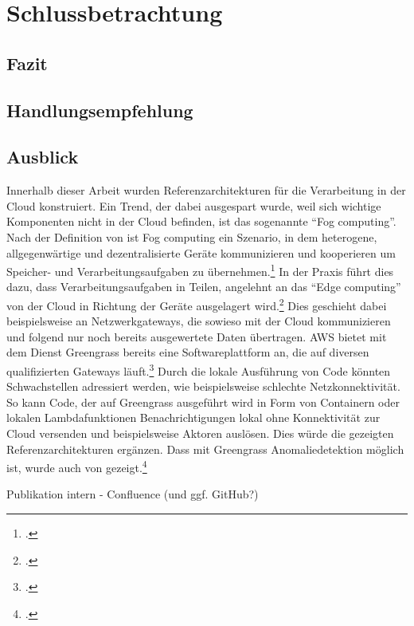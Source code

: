 \chapter{Schlussbetrachtung}

\section{Fazit}

\section{Handlungsempfehlung}

\section{Ausblick}
Innerhalb dieser Arbeit wurden Referenzarchitekturen für die Verarbeitung in der Cloud konstruiert. Ein Trend, der dabei ausgespart wurde, weil sich wichtige Komponenten nicht in der Cloud befinden, ist das sogenannte \enquote{Fog computing}. Nach der Definition von \citeauthor{Vaquero.2014} ist Fog computing ein Szenario, in dem heterogene, allgegenwärtige und dezentralisierte Geräte kommunizieren und kooperieren um Speicher- und Verarbeitungsaufgaben zu übernehmen.\footcite[Vgl.][30\psq]{Vaquero.2014} In der Praxis führt dies dazu, dass Verarbeitungsaufgaben in Teilen, angelehnt an das \enquote{Edge computing} von der Cloud in Richtung der Geräte ausgelagert wird.\footcite[Vgl.][]{Bonomi.2012} Dies geschieht dabei beispielsweise an Netzwerkgateways, die sowieso mit der Cloud kommunizieren und folgend nur noch bereits ausgewertete Daten übertragen. \ac{AWS} bietet mit dem Dienst Greengrass bereits eine Softwareplattform an, die auf diversen qualifizierten Gateways läuft.\footcite[Vgl. auch im Folgenden][]{AmazonWebServicesInc..o.J.bu} Durch die lokale Ausführung von Code könnten Schwachstellen adressiert werden, wie beispielsweise schlechte Netzkonnektivität. So kann Code, der auf Greengrass ausgeführt wird in Form von Containern oder lokalen Lambdafunktionen Benachrichtigungen lokal ohne Konnektivität zur Cloud versenden und beispielsweise Aktoren auslösen. Dies würde die gezeigten Referenzarchitekturen ergänzen. Dass mit Greengrass Anomaliedetektion möglich ist, wurde auch von \citeauthor{Shankar.2020} gezeigt.\footcite[Vgl.][]{Shankar.2020}

Publikation intern - Confluence (und ggf. GitHub?)